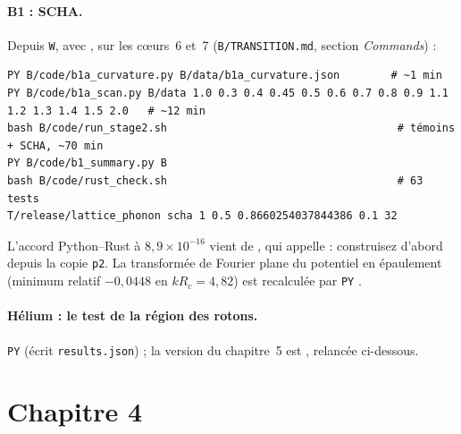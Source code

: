 \paragraph{B1 : SCHA.} Depuis \texttt{W}, avec , sur les cœurs~6 et~7
(\texttt{B/TRANSITION.md}, section \emph{Commands}) :
\begin{lstlisting}[style=appC,language={}]
PY B/code/b1a_curvature.py B/data/b1a_curvature.json        # ~1 min
PY B/code/b1a_scan.py B/data 1.0 0.3 0.4 0.45 0.5 0.6 0.7 0.8 0.9 1.1 1.2 1.3 1.4 1.5 2.0   # ~12 min
bash B/code/run_stage2.sh                                    # témoins + SCHA, ~70 min
PY B/code/b1_summary.py B
bash B/code/rust_check.sh                                    # 63 tests
T/release/lattice_phonon scha 1 0.5 0.8660254037844386 0.1 32
\end{lstlisting}
L'accord Python--Rust à $8{,}9\times10^{-16}$ vient de ,
qui appelle  : construisez d'abord depuis la copie \texttt{p2}. La transformée de Fourier
plane du potentiel en épaulement (minimum relatif $-0{,}0448$ en $kR_c=4{,}82$) est recalculée par
\texttt{PY} .

\paragraph{Hélium : le test de la région des rotons.} \texttt{PY} 
(écrit \texttt{results.json}) ; la version du chapitre~5 est , relancée ci-dessous.

\section{Chapitre 4}\label{appE:sec:ch4}

